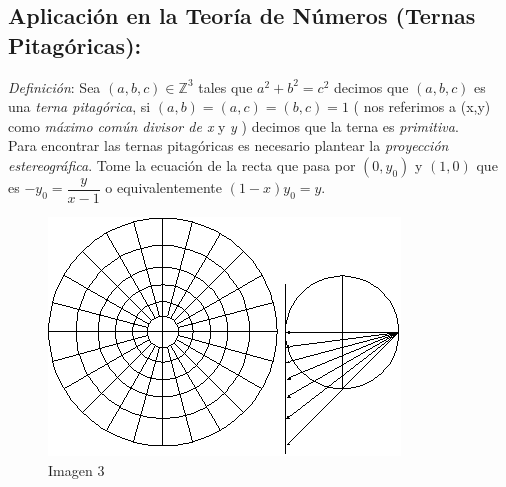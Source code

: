 \documentclass[10pt,a4paper]{article}
\begin{document}
\subsection{Aplicación en la Teoría de Números (Ternas Pitagóricas):}

\textit{Definición}: Sea $(a,b,c) \in \mathbb{Z}^{3}$ tales que $a^2+b^2=c^2$ decimos que $(a,b,c)$ es una \textit{terna pitagórica}, si $(a,b)=(a,c)=(b,c)=1$ ( nos referimos a (x,y) como \textit{máximo común divisor de x} y \textit{y} ) decimos que la terna es \textit{primitiva}.
\\
Para encontrar las ternas pitagóricas es necesario plantear la \textit{proyección estereográfica}. Tome la ecuación de la recta que pasa por $(0,y_{0})$ y $(1,0)$ que es $-y_{0}=\dfrac{y}{x-1}$ o equivalentemente $(1-x)y_{0}=y$. 


\begin{figure}[h!]
    \centering
    \includegraphics[scale=0.5]{imagen3.png}
    \caption{Imagen 3}
\end{figure}
\end{document}

